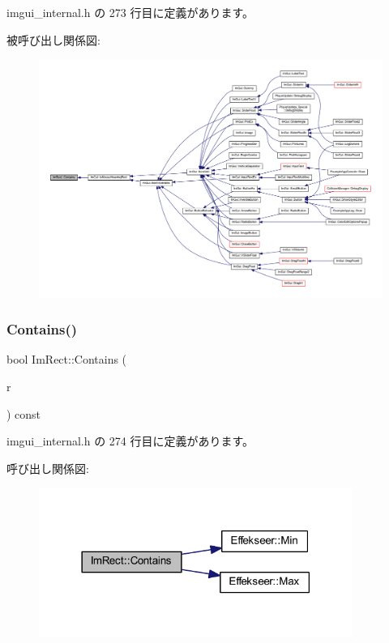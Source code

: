 imgui\+\_\+internal.\+h の 273 行目に定義があります。

被呼び出し関係図\+:\nopagebreak
\begin{figure}[H]
\begin{center}
\leavevmode
\includegraphics[width=350pt]{struct_im_rect_ac583156fd0e9306181fff5d120b262ea_icgraph}
\end{center}
\end{figure}
\mbox{\label{struct_im_rect_ad6043344d8ac30d5f342c71641cfe24b}} 
\subsubsection{\texorpdfstring{Contains()}{Contains()}\hspace{0.1cm}{\footnotesize\ttfamily [2/2]}}
{\footnotesize\ttfamily bool Im\+Rect\+::\+Contains (\begin{DoxyParamCaption}\item[{const \mbox{\hyperlink{struct_im_rect}{Im\+Rect}} \&}]{r }\end{DoxyParamCaption}) const\hspace{0.3cm}{\ttfamily [inline]}}



 imgui\+\_\+internal.\+h の 274 行目に定義があります。

呼び出し関係図\+:\nopagebreak
\begin{figure}[H]
\begin{center}
\leavevmode
\includegraphics[width=290pt]{struct_im_rect_ad6043344d8ac30d5f342c71641cfe24b_cgraph}
\end{center}
\end{figure}
\mbox{\label{struct_im_rect_af33a7424c3341d08acd69da30c27c753}} 
